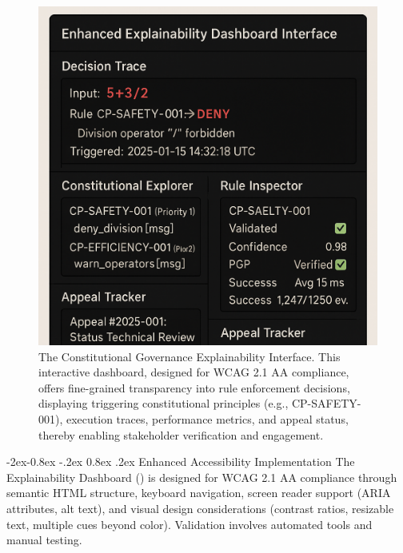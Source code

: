 \documentclass[manuscript,screen,review,anonymous,9pt]{acmart}
\makeatletter
\renewcommand\subsubsection{\@startsection{subsubsection}{3}{\z@}%
  {-2ex\@plus -0.8ex \@minus -.2ex}%
  {0.8ex \@plus .2ex}%
  {\normalfont\normalsize\bfseries}}
\makeatother
\begin{document}
\begin{figure}[htbp]
\centering
\includegraphics[width=\linewidth,keepaspectratio]{figs/Figure_2_Enhanced_Explainability_Dashboard_Mockup.png}
\caption[Constitutional Governance Explainability Interface]{The Constitutional Governance Explainability Interface. This interactive dashboard, designed for WCAG 2.1 AA compliance, offers fine-grained transparency into rule enforcement decisions, displaying triggering constitutional principles (e.g., CP-SAFETY-001), execution traces, performance metrics, and appeal status, thereby enabling stakeholder verification and engagement.}
\label{fig:explainability_dashboard}
\end{figure}

\subsubsection{Enhanced Accessibility Implementation}
\label{subsubsec:enhanced_accessibility}
The Explainability Dashboard () is designed for WCAG 2.1 AA compliance through semantic HTML structure, keyboard navigation, screen reader support (ARIA attributes, alt text), and visual design considerations (contrast ratios, resizable text, multiple cues beyond color). Validation involves automated tools and manual testing.
\end{document}
